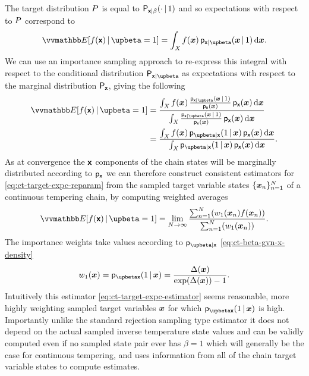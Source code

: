 The target distribution $P$ is equal to $\mathsf{P}_{\boldsymbol{\mathsf{x}}|\beta}(\cdot \operatorname{|} 1)$ and so expectations with respect to $P$ correspond to
\begin{equation}
\expc{f(\rvct{x})\gvn\upbeta=1} =
\int_{\set{X}} f(\vct{x})\,\pden{\rvct{x}|\upbeta}(\vct{x}\gvn 1)\,\dr\vct{x}.
\end{equation}
We can use an importance sampling approach to re-express this integral with respect to the conditional distribution $\prob{\rvct{x}|\upbeta}$ as expectations with respect to the marginal distribution $\mathsf{P}_{\boldsymbol{\mathsf{x}}}$, giving the following
\begin{align}
\expc{f(\rvct{x})\gvn\upbeta=1} &=
\frac{
  \int_{\set{X}} 
    f(\vct{x})\, \frac{\pden{\rvct{x}|\upbeta}(\vct{x}\gvn 1)}{\pden{\rvct{x}}(\vct{x})} \, \pden{\rvct{x}}(\vct{x})
  \,\dr\vct{x}
}{
  \int_{\set{X}} 
    \frac{\pden{\rvct{x}|\upbeta}(\vct{x} \gvn 1)}{\pden{\rvct{x}}(\vct{x})} \, \pden{\rvct{x}}(\vct{x})
  \,\dr\vct{x}
} \\ \label{eq:ct-target-expc-reparam}
&=
\frac{
  \int_{\set{X}} 
    f(\vct{x})\, \pden{\upbeta|\rvct{x}}(1 \gvn \vct{x}) \, \pden{\rvct{x}}(\vct{x})
  \,\dr\vct{x}
}{
  \int_{\set{X}} 
    \pden{\upbeta|\rvct{x}}(1 \gvn \vct{x}) \, \pden{\rvct{x}}(\vct{x})
  \,\dr\vct{x}
} .
\end{align}
As at convergence the $\boldsymbol{\mathsf{x}}$ components of the chain states will be marginally distributed according to $\mathsf{p}_{\boldsymbol{\mathsf{x}}}$ we can therefore construct consistent estimators for \eqref{eq:ct-target-expc-reparam} from the sampled target variable states $\lbrace \boldsymbol{x}_n \rbrace_{n=1}^N$ of a continuous tempering chain, by computing weighted averages
\begin{equation}\label{eq:ct-target-expc-estimator}
\expc{f(\rvct{x})\gvn\upbeta=1} =
\lim_{N \to \infty}
\frac
{\sum_{n=1}^N \lpa w_1\lpa \vct{x}_n\rpa f\lpa\vct{x}_n\rpa\rpa}
{\sum_{n=1}^N\lpa w_1\lpa \vct{x}_n\rpa \rpa}.
\end{equation}
The importance weights take values according to $\pden{\upbeta|\rvct{x}}$ \eqref{eq:ct-beta-gvn-x-density}
\begin{equation}\label{eq:ct-target-expc-estimator-importance-weight}
w_1(\vct{x}) = \pden{\upbeta \rvct{x}}(1 \gvn \vct{x}) = \frac{\Delta(\vct{x})}{\exp\lpa\Delta(\vct{x})\rpa - 1}.
\end{equation}
Intuitively this estimator \eqref{eq:ct-target-expc-estimator} seems reasonable, more highly weighting sampled target variables $\boldsymbol{x}$ for which $\pden{\upbeta \rvct{x}}(1 \gvn \vct{x})$ is high. Importantly unlike the standard rejection sampling type estimator it does not depend on the actual sampled inverse temperature state values and can be validly computed even if no sampled state pair ever has $\beta = 1$ which will generally be the case for continuous tempering, and uses information from all of the chain target variable states to compute estimates.


